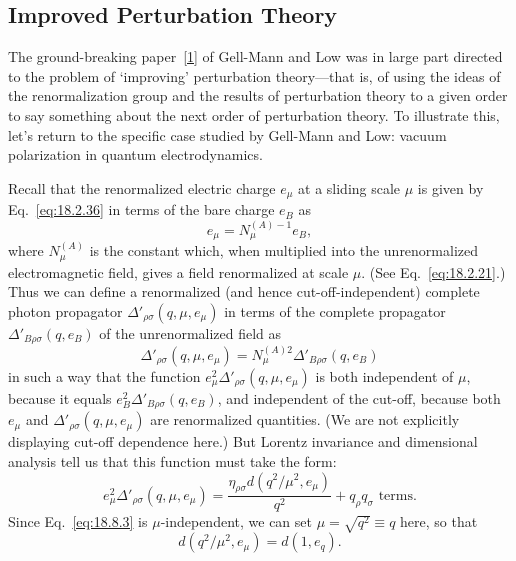 
\subsection[Improved Perturbation Theory]{Improved Perturbation Theory\footnotemark}

The ground-breaking paper~\hyperref[ch18-ref-1]{[1]} of Gell-Mann and Low was in large part directed to the problem of `improving' perturbation theory---that is, of using the ideas of the renormalization group and the results of perturbation theory to a given order to say something about the next order of perturbation theory. To illustrate this, let's return to the specific case studied by Gell-Mann and Low: vacuum polarization in quantum electrodynamics.

Recall that the renormalized electric charge $e_\mu$ at a sliding scale $\mu$ is given by Eq.~\eqref{eq:18.2.36} in terms of the bare charge $e_B$ as
\begin{equation}
e_\mu=N_\mu^{(A)-1}e_B,
\tag{18.8.1}\label{eq:18.8.1}
\end{equation}
where $N_\mu^{(A)}$ is the constant which, when multiplied into the unrenormalized electromagnetic field, gives a field renormalized at scale $\mu$. (See Eq.~\eqref{eq:18.2.21}.) Thus we can define a renormalized (and hence cut-off-independent) complete photon propagator $\Delta'_{\rho\sigma}(q,\mu,e_\mu)$ in terms of the complete propagator $\Delta'_{B\rho\sigma}(q,e_B)$ of the unrenormalized field as
\begin{equation}
\Delta'_{\rho\sigma}(q,\mu,e_\mu)
=N_\mu^{(A)2}\Delta'_{B\rho\sigma}(q,e_B)
\tag{18.8.2}\label{eq:18.8.2}
\end{equation}
in such a way that the function $e_\mu^2\Delta'_{\rho\sigma}(q,\mu,e_\mu)$ is both independent of $\mu$, because it equals $e_B^2\Delta'_{B\rho\sigma}(q,e_B)$, and independent of the cut-off, because both $e_\mu$ and $\Delta'_{\rho\sigma}(q,\mu,e_\mu)$ are renormalized quantities. (We are not explicitly displaying cut-off dependence here.) But Lorentz invariance and dimensional analysis tell us that this function must take the form:
\begin{equation}
e_\mu^2\Delta'_{\rho\sigma}(q,\mu,e_\mu)
=\frac{\eta_{\rho\sigma}d(q^2/\mu^2,e_\mu)}{q^2}
+q_\rho q_\sigma\text{ terms}.
\tag{18.8.3}\label{eq:18.8.3}
\end{equation}
Since Eq.~\eqref{eq:18.8.3} is $\mu$-independent, we can set $\mu=\sqrt{q^2}\equiv q$ here, so that
\begin{equation}
d(q^2/\mu^2,e_\mu)=d(1,e_q).
\tag{18.8.4}\label{eq:18.8.4}
\end{equation}

